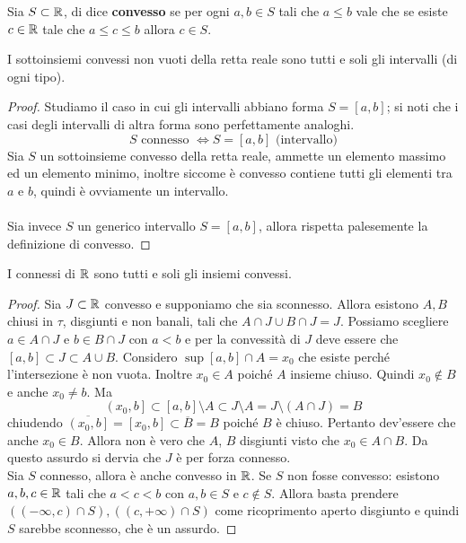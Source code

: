 \begin{definition}
	Sia $S \subset \mathbb{R}$, di dice \textbf{convesso} se per ogni $a, b\in S$ tali che $a \le b$ vale che se esiste $c\in \mathbb{R}$ tale che $a\le c\le b$ allora $c\in S$.
\end{definition} 
\begin{theorem}
	I sottoinsiemi convessi non vuoti della retta reale sono tutti e soli gli intervalli (di ogni tipo).
\end{theorem}
\begin{proof} Studiamo il caso in cui gli intervalli abbiano forma $S=[a,b]$; si noti che i casi degli intervalli di altra forma sono perfettamente analoghi.
	\begin{equation*}
	S \text{ connesso } \iff S=[a,b] \text{ (intervallo)}
	\end{equation*}
	Sia $S$ un sottoinsieme convesso della retta reale, ammette un elemento massimo ed un elemento minimo, inoltre siccome è convesso contiene tutti gli elementi tra $a$ e $b$, quindi è ovviamente un intervallo. \\ \\ Sia invece $S$ un generico intervallo $S=[a,b]$, allora rispetta palesemente la definizione di convesso.
\end{proof}
\begin{theorem}
	I connessi di $\mathbb{R}$ sono tutti e soli gli insiemi convessi. 
\end{theorem}
\begin{proof}
	Sia $J \subset \mathbb{R}$ convesso e supponiamo che sia sconnesso. Allora esistono $A, B$ chiusi in $\tau$, disgiunti e non banali, tali che $A \cap J \cup B \cap J = J$. Possiamo scegliere $a \in A \cap J$ e $b \in B \cap J$ con $a < b$ e per la convessità di $J$ deve essere che $\left[a,b\right] \subset J \subset A \cup B$. Considero $\sup \left[a,b\right] \cap A = x_0$ che esiste perché l'intersezione è non vuota. Inoltre $x_0 \in A$ poiché $A$ insieme chiuso. Quindi $x_0 \notin B$ e anche $x_0 \neq b$. Ma 
	\begin{equation*}
		\left(x_0, b\right] \subset \left[a,b\right] \setminus A \subset J \setminus A =  J \setminus (A \cap J) = B
	\end{equation*}
	chiudendo $\overline{\left(x_0, b\right]} = \left[x_0, b\right] \subset \overline{B} = B$ poiché $B$ è chiuso. Pertanto dev'essere che anche $x_0 \in B$. Allora non è vero che $A$, $B$ disgiunti visto che $x_0 \in A \cap B$. Da questo assurdo si dervia che $J$ è per forza connesso.\\
	
	Sia $S$ connesso, allora è anche convesso in $\mathbb{R}$. Se $S$ non fosse convesso: esistono $a,b,c \in \mathbb{R}$ tali che $a < c < b$ con $a,b \in S$ e $c \notin S$. Allora basta prendere $((-\infty, c) \cap S), ((c, +\infty) \cap S)$ come ricoprimento aperto disgiunto e quindi $S$ sarebbe sconnesso, che è un assurdo.
\end{proof}

